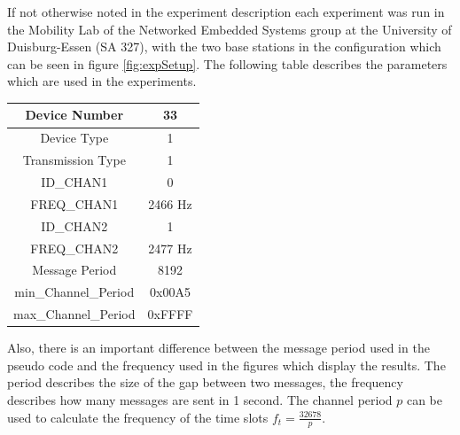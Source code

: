 If not otherwise noted in the experiment description each experiment was run in the Mobility Lab of the Networked Embedded Systems group at the University of Duisburg-Essen (SA 327), with the two base stations in the configuration which can be seen in figure \ref{fig:expSetup}. The following table describes the parameters which are used in the experiments.
\begin{center}
\begin{tabular}{|c|c|}
	\hline Device Number & 33 \\ 
	\hline Device Type & 1 \\ 
	\hline Transmission Type & 1 \\ 
	\hline ID\_CHAN1 & 0 \\ 
	\hline FREQ\_CHAN1 & 2466 Hz \\ 
	\hline ID\_CHAN2 & 1 \\ 
	\hline FREQ\_CHAN2 & 2477 Hz \\ 
	\hline Message Period & 8192 \\ 
	\hline min\_Channel\_Period & 0x00A5 \\ 
	\hline max\_Channel\_Period & 0xFFFF \\ 
	\hline 
\end{tabular} 		
\end{center}

Also, there is an important difference between the message period used in the pseudo code and the frequency used in the figures which display the results. The period describes the size of the gap between two messages, the frequency describes how many messages are sent in 1 second. The channel period $p$ can be used to calculate the frequency of the time slots $f_t = \frac{32678}{p}$.  
\newpage

